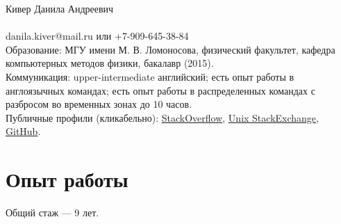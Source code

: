 \documentclass[letterpaper, 11pt]{article}
\begin{document}
    \noindent
    \Huge
    Кивер Данила Андреевич \\ \\
    \normalsize
    danila.kiver@mail.ru или +7-909-645-38-84 \\

    \noindent
    Образование: МГУ имени М. В. Ломоносова, физический факультет, кафедра компьютерных методов физики, бакалавр (2015). \\

    \noindent
    Коммуникация: upper-intermediate английский; есть опыт работы в англоязычных командах; есть опыт работы в распределенных командах с разбросом во временных зонах до 10 часов. \\

    \noindent
    Публичные профили (кликабельно): \href{https://stackoverflow.com/users/7191047/danila-kiver}{StackOverflow}, \href{https://unix.stackexchange.com/users/297621/danila-kiver}{Unix StackExchange}, \href{https://github.com/QazerLab}{GitHub}.





    \section{Опыт работы}

    Общий стаж --- 9 лет.
\end{document}
